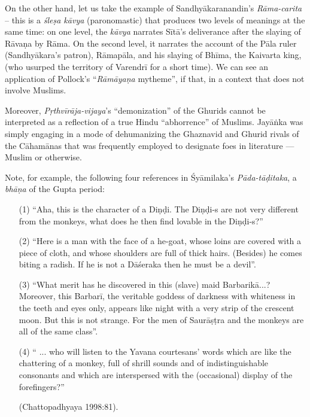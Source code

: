 On the other hand, let us take the example of Sandhyākaranandin's {\sl Rāma-carita} – this is a {\sl śleṣa kāvya} (paronomastic) that produces two levels of meanings at the same time: on one level, the {\sl kāvya} narrates Sītā’s deliverance after the slaying of Rāvaṇa by Rāma.  On the second level, it narrates the account of the Pāla ruler (Sandhyākara’s patron), Rāmapāla, and his slaying of Bhīma, the Kaivarta king, (who usurped the territory of Varendrī for a short time). We can see an application of Pollock’s “{\sl Rāmāyaṇa} mytheme”, if that, in a context that does not involve Muslims. 


Moreover, {\sl Pṛthvīrāja-vijaya}’s “demonization” of the Ghurids cannot be interpreted as a reflection of a true Hindu “abhorrence” of Muslims. Jayāṅka was simply engaging in a mode of dehumanizing the Ghaznavid and Ghurid rivals of the Cāhamānas that was frequently employed to designate foes in literature — Muslim or otherwise. 

Note, for example, the following four references in Śyāmilaka’s {\sl Pāda-tāḍitaka}, a {\sl bhāṇa} of the Gupta period: 
\begin{itemize}
\item[(1)] “Aha, this is the character of a Diṇḍi. The Diṇḍi-s are not very different from the monkeys, what does he then find lovable in the Diṇḍi-s?”

\item[(2)] “Here is a man with the face of a he-goat, whose loins are covered with a piece of cloth, and whose shoulders are full of thick hairs. (Besides) he comes biting a radish. If he is not a Dāśeraka then he must be a devil”. 

\item[(3)] “What merit has he discovered in this (slave) maid Barbarikā...? Moreover, this Barbarī, the veritable goddess of darkness with whiteness in the teeth and eyes only, appears like night with a very strip of the crescent moon. But this is not strange. For the men of Saurāṣṭra and the monkeys are all of the same class”. 

\item[(4)] “ ... who will listen to the Yavana courtesans’ words which are like the chattering of a monkey, full of shrill sounds and of indistinguishable consonants and which are interspersed with the (occasional) display of the forefingers?” 

\hfill (Chattopadhyaya 1998:81). 
\end{itemize}

